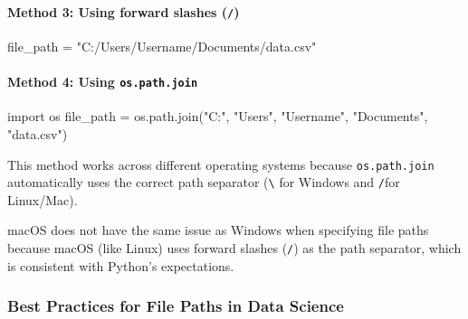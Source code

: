 \documentclass[
  letterpaper,
  DIV=11,
  numbers=noendperiod]{scrreprt}
\let\oldparagraph\paragraph
\renewcommand{\paragraph}[1]{\oldparagraph{#1}\mbox{}}
\newenvironment{Shaded}{\begin{snugshade}}{\end{snugshade}}
\newcommand{\ImportTok}[1]{\textcolor[rgb]{0.00,0.46,0.62}{#1}}
\newcommand{\NormalTok}[1]{\textcolor[rgb]{0.00,0.23,0.31}{#1}}
\newcommand{\OperatorTok}[1]{\textcolor[rgb]{0.37,0.37,0.37}{#1}}
\newcommand{\StringTok}[1]{\textcolor[rgb]{0.13,0.47,0.30}{#1}}
\begin{document}
\hypertarget{method-3-using-forward-slashes}{%
\paragraph{\texorpdfstring{Method 3: \textbf{Using forward slashes
(\texttt{/})}}{Method 3: Using forward slashes (/)}}\label{method-3-using-forward-slashes}}

\begin{Shaded}
\begin{Highlighting}[]
\NormalTok{file\_path }\OperatorTok{=} \StringTok{"C:/Users/Username/Documents/data.csv"}
\end{Highlighting}
\end{Shaded}

\hypertarget{method-4-using-os.path.join}{%
\paragraph{\texorpdfstring{Method 4: \textbf{Using
\texttt{os.path.join}}}{Method 4: Using os.path.join}}\label{method-4-using-os.path.join}}

\begin{Shaded}
\begin{Highlighting}[]
\ImportTok{import}\NormalTok{ os}
\NormalTok{file\_path }\OperatorTok{=}\NormalTok{ os.path.join(}\StringTok{"C:"}\NormalTok{, }\StringTok{"Users"}\NormalTok{, }\StringTok{"Username"}\NormalTok{, }\StringTok{"Documents"}\NormalTok{, }\StringTok{"data.csv"}\NormalTok{)}
\end{Highlighting}
\end{Shaded}

This method works across different operating systems because
\texttt{os.path.join} automatically uses the correct path separator
(\texttt{\textbackslash{}} for Windows and \texttt{/}for Linux/Mac).

macOS does not have the same issue as Windows when specifying file paths
because macOS (like Linux) uses forward slashes (\texttt{/}) as the path
separator, which is consistent with Python's expectations.

\hypertarget{best-practices-for-file-paths-in-data-science}{%
\subsubsection{Best Practices for File Paths in Data
Science}\label{best-practices-for-file-paths-in-data-science}}
\end{document}
